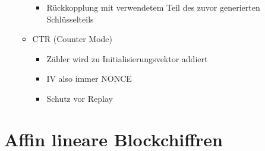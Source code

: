 \documentclass[11pt, paper=a4, twocolumn]{scrartcl}
\begin{document}
\begin{itemize}
\begin{itemize}
\begin{itemize}
							\item Rückkopplung mit verwendetem Teil des zuvor generierten Schlüsselteils
						\end{itemize}
					\item CTR (Counter Mode)
						\begin{itemize}
							\item Zähler wird zu Initialisierungsvektor addiert
							\item IV also immer NONCE
							\item Schutz vor Replay
						\end{itemize}
				\end{itemize}
		\end{itemize}
	
	\section{Affin lineare Blockchiffren}
\end{document}
